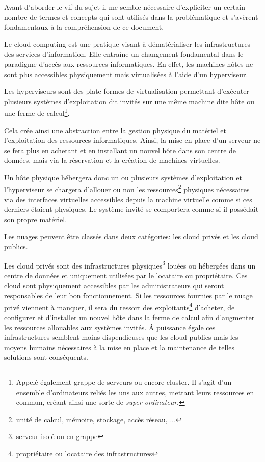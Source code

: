\documentclass[11pt, a4paper ]{article}
\begin{document}
\begin{spacing}{1.5}
Avant d'aborder le vif du sujet il me semble nécessaire d'expliciter un certain nombre de termes et concepts qui sont utilisés dans la problématique et s'avèrent fondamentaux à la compréhension de ce document.

Le cloud computing\cite{cloudDef} est une pratique visant à dématérialiser les infrastructures des services d'information. Elle entraîne un changement fondamental dans le paradigme d'accès aux ressources informatiques. En effet, les machines hôtes ne sont plus accessibles physiquement mais virtualisées à l'aide d'un hyperviseur.

Les hyperviseurs sont des plate-formes de virtualisation permettant d’exécuter plusieurs systèmes d'exploitation dit invités sur une même machine dite hôte ou une ferme de calcul\footnote{Appelé également grappe de serveurs ou encore cluster. Il s'agit d'un ensemble d'ordinateurs reliés les uns aux autres, mettant leurs ressources en commun, créant ainsi une sorte de \emph{super ordinateur}. }.

Cela crée ainsi une abstraction entre la gestion physique du matériel et l'exploitation des ressources informatiques. Ainsi, la mise en place d'un serveur ne se fera plus en achetant et en installant un nouvel hôte dans son centre de données, mais via la réservation et la création de machines virtuelles.

Un hôte physique hébergera donc un ou plusieurs systèmes d'exploitation et l'hyperviseur se chargera d'allouer ou non les ressources\footnote{unité de calcul, mémoire, stockage, accès réseau, ...}  physiques nécessaires via des interfaces virtuelles accessibles depuis la machine virtuelle comme si ces derniers étaient physiques. Le système invité se comportera comme si il possédait son propre matériel.

Les nuages peuvent être classés dans deux catégories: les cloud privés et les cloud publics.


Les cloud privés sont des infrastructures physiques\footnote{serveur isolé ou en grappe} louées ou hébergées dans un centre de données et uniquement utilisées par le locataire ou propriétaire. Ces cloud sont physiquement accessibles par les administrateurs qui seront responsables de leur bon fonctionnement. Si les ressources fournies par le nuage privé viennent à manquer, il sera du ressort des exploitants\footnote{propriétaire ou locataire des infrastructures} d'acheter, de configurer et d'installer un nouvel hôte dans la ferme de calcul afin d'augmenter les ressources allouables aux systèmes invités. Á puissance égale ces infrastructures semblent moins dispendieuses que les cloud publics mais les moyens humains nécessaires à la mise en place et la maintenance de telles solutions sont conséquents.


\end{spacing}
\end{document}
